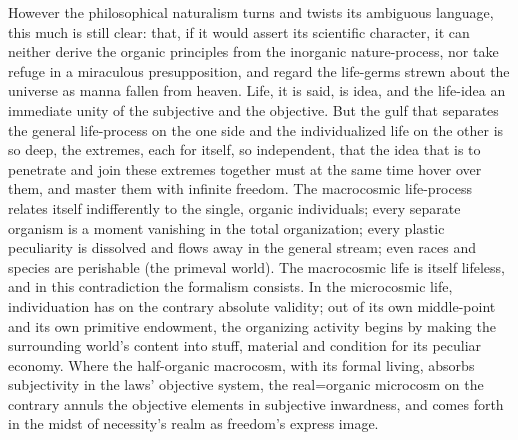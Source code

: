 \documentclass[12pt]{book}
\begin{document}
However the philosophical naturalism turns and twists its ambiguous
language, this much is still clear: that, if it would assert its scientific
character, it can neither derive the organic principles from the inorganic
nature-process, nor take refuge in a miraculous presupposition, and regard
the life-germs strewn about the universe as manna fallen from heaven. Life,
it is said, is idea, and the life-idea an immediate unity of the subjective
and the objective. But the gulf that separates the general life-process on
the one side and the individualized life on the other is so deep, the
extremes, each for itself, so independent, that the idea that is to
penetrate and join these extremes together must at the same time hover over
them, and master them with infinite freedom. The macrocosmic life-process
relates itself indifferently to the single, organic individuals; every
separate organism is a moment vanishing in the total organization; every
plastic peculiarity is dissolved and flows away in the general stream; even
races and species are perishable (the primeval world). The macrocosmic life
is itself lifeless, and in this contradiction the formalism consists. In the
microcosmic life, individuation has on the contrary absolute validity; out
of its own middle-point and its own primitive endowment, the organizing
activity begins by making the surrounding world's content into stuff,
material and condition for its peculiar economy. Where the half-organic
macrocosm, with its formal living, absorbs subjectivity in the laws'
objective system, the real=organic microcosm on the contrary annuls the
objective elements in subjective inwardness, and comes forth in the midst of
necessity's realm as freedom's express image.
\end{document}
